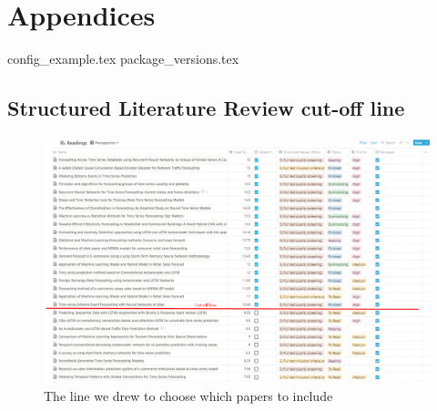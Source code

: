 
\chapter{Appendices}
\label{cha:appendices}
{config_example.tex}
{package_versions.tex}

\section{Structured Literature Review cut-off line}
\label{cha:slr-cut-off-line}

\begin{figure}[h!]
  \centering
  \includegraphics[width=\textwidth]{./figs/illustrations/LSR-cut-off-line.png}
  \hfill
  \caption{The line we drew to choose which papers to include}
  \label{fig:slr-cut-off-line}
\end{figure}

